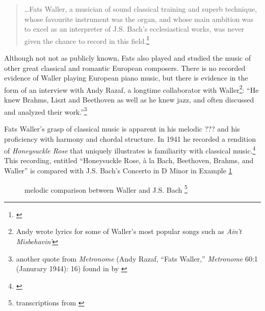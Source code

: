 \documentclass[11pt]{report}
\begin{document}
	\begin{quote}
		\ldots Fats Waller, a musician of sound classical training and superb technique, whose favourite instrument was the organ, and whose main ambition was to excel as an interpreter of J.S. Bach's ecclesiastical works, was never given the chance to record in this field.\footnote{\cite[209]{jazz_scene}}
	\end{quote}
	
	Although not not as publicly known, Fats also played and studied the music of other great classical and romantic European composers. There is no recorded evidence of Waller playing European piano music, but there is evidence in the form of an interview with Andy Razaf, a longtime collaborator with Waller\footnote{Andy wrote lyrics for some of Waller's most popular songs such as \emph{Ain't Misbehavin'}}: ``He knew Brahms, Liszt and Beethoven as well as he knew jazz, and often discussed and analyzed their work.''\footnote{another quote from \emph{Metronome} (Andy Razaf, ``Fats Waller,'' \emph{Metronome} 60:1 (Janurary 1944): 16) found in  by \cite{transcriptions}}
	
	Fats Waller's grasp of classical music is apparent in his melodic ??? and his proficiency with harmony and chordal structure. In 1941 he recorded a rendition of \emph{Honeysuckle Rose} that uniquely illustrates is familiarity with classical music.\footnote{\cite{transcriptions}} This recording, entitled ``Honeysuckle Rose, \`a la Bach, Beethoven, Brahms, and Waller'' is compared with J.S. Bach's Concerto in D Minor in Example \ref{fig:3bs}
	
	
	
		\begin{figure}[ht]
			\centering
					\begin{minipage}{\textwidth}
				
				\caption{melodic comparison between Waller and J.S. Bach \protect\footnote{\scriptsize transcriptions from \cite[]{transcriptions}}}
				\label{fig:3bs}
				
				\subfigure[woot]{
					

				{%
\parindent 0pt
\ifx\preLilyPondExample \undefined
\else
  \expandafter\preLilyPondExample
\fi
\def\lilypondbook{}%

\ifx\postLilyPondExample \undefined
\else
  \expandafter\postLilyPondExample
\fi
}
				
				}



							\subfigure[another woot]{


							{%
\parindent 0pt
\ifx\preLilyPondExample \undefined
\else
  \expandafter\preLilyPondExample
\fi
\def\lilypondbook{}%

\ifx\postLilyPondExample \undefined
\else
  \expandafter\postLilyPondExample
\fi
}

							}
						\end{minipage}

		\end{figure}
	
\end{document}
